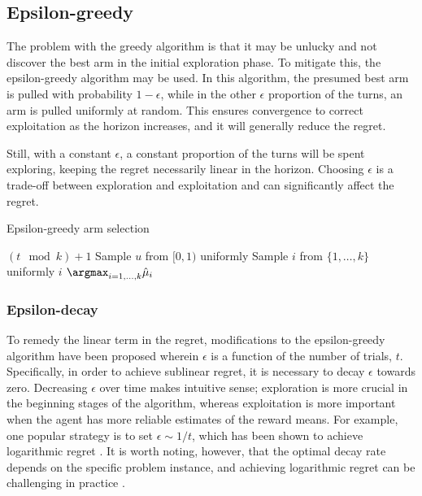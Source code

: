 \subsection{Epsilon-greedy}
The problem with the greedy algorithm is that it may be unlucky and not discover the best arm in the initial exploration phase.
To mitigate this, the epsilon-greedy algorithm may be used.
In this algorithm, the presumed best arm is pulled with probability $1-\epsilon$, while in the other $\epsilon$ proportion of the turns, an arm is pulled uniformly at random.
This ensures convergence to correct exploitation as the horizon increases, and it will generally reduce the regret.

Still, with a constant $\epsilon$, a constant proportion of the turns will be spent exploring, keeping the regret necessarily linear in the horizon.
Choosing $\epsilon$ is a trade-off between exploration and exploitation and can significantly affect the regret.

\begin{algorithm}
    \caption{Epsilon-greedy arm selection}
    \label{alg:eps_greedy}
    \begin{algorithmic}
        \State \Return $(t \mod k) + 1$
        \Else
        \State Sample $u$ from $[0,1)$ uniformly
        \State Sample $i$ from $\{1,\dots, k\}$ uniformly
        \State \Return $i$
        \Else
        \State \Return $\argmax_{i=1,\dots,k} \hat{\mu}_i$
        \EndIf
        \EndIf
    \end{algorithmic}
\end{algorithm}


\subsubsection{Epsilon-decay}
To remedy the linear term in the regret, modifications to the epsilon-greedy algorithm have been proposed wherein $\epsilon$ is a function of the number of trials, $t$.
Specifically, in order to achieve sublinear regret, it is necessary to decay $\epsilon$ towards zero.
Decreasing $\epsilon$ over time makes intuitive sense; exploration is more crucial in the beginning stages of the algorithm, whereas exploitation is more important when the agent has more reliable estimates of the reward means.
For example, one popular strategy is to set $\epsilon \sim 1/t$, which has been shown to achieve logarithmic regret \cite{auer2002}.
It is worth noting, however, that the optimal decay rate depends on the specific problem instance, and achieving logarithmic regret can be challenging in practice \cite{bubeck2012}.

